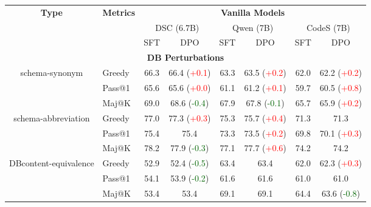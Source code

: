 \begin{table*}[t!]
    \centering
\begin{adjustbox}{max width=\textwidth}
    \begin{tabular}{c | l | c c | c c | c c }
        \toprule
         \multirow{3}{*}{\textbf{Type}} & \multirow{3}{*}{\textbf{Metrics}} & \multicolumn{6}{c}{\textbf{Vanilla Models}} \\ \cline{3-8}
         & & \multicolumn{2}{c}{DSC (6.7B)} & \multicolumn{2}{c}{Qwen (7B)} & \multicolumn{2}{c}{CodeS (7B)} \\ \cline{3-8}
         & & SFT & DPO & SFT & DPO & SFT & DPO \\ \midrule
        \multicolumn{8}{c}{\textbf{DB Perturbations}} \\ \midrule

        \multirow{3}{*}{schema-synonym} & Greedy & 66.3 & 66.4 (\textcolor{red}{+0.1}) & 63.3 & 63.5 (\textcolor{red}{+0.2}) & 62.0 & 62.2 (\textcolor{red}{+0.2}) \\
        & Pass@1 & 65.6 & 65.6 (\textcolor{red}{+0.0}) & 61.1 & 61.2 (\textcolor{red}{+0.1}) & 59.7 & 60.5 (\textcolor{red}{+0.8}) \\
        & Maj@K & 69.0 & 68.6 (\textcolor{darkgreen}{-0.4}) & 67.9 & 67.8 (\textcolor{darkgreen}{-0.1}) & 65.7 & 65.9 (\textcolor{red}{+0.2}) \\ \midrule

        \multirow{3}{*}{schema-abbreviation} & Greedy & 77.0 & 77.3 (\textcolor{red}{+0.3}) & 75.3 & 75.7 (\textcolor{red}{+0.4}) & 71.3 & 71.3 \phantom{(+0.3)} \\
        & Pass@1 & 75.4 & 75.4 \phantom{(+0.3)} & 73.3 & 73.5 (\textcolor{red}{+0.2}) & 69.8 & 70.1 (\textcolor{red}{+0.3}) \\
        & Maj@K & 78.2 & 77.9 (\textcolor{darkgreen}{-0.3}) & 77.1 & 77.7 (\textcolor{red}{+0.6}) & 74.2 & 74.2 \phantom{(+0.3)} \\ \midrule

        \multirow{3}{*}{DBcontent-equivalence} & Greedy & 52.9 & 52.4 (\textcolor{darkgreen}{-0.5}) & 63.4 & 63.4 \phantom{(+0.3)} & 62.0 & 62.3 (\textcolor{red}{+0.3}) \\
        & Pass@1 & 54.1 & 53.9 (\textcolor{darkgreen}{-0.2}) & 61.6 & 61.6 \phantom{(+0.3)} & 61.0 & 61.0 \phantom{(+0.3)} \\
        & Maj@K & 53.4 & 53.4 \phantom{(+0.3)} & 69.1 & 69.1 \phantom{(+0.3)} & 64.4 & 63.6 (\textcolor{darkgreen}{-0.8}) \\ \midrule


\end{tabular}
\end{adjustbox}
\end{table*}
